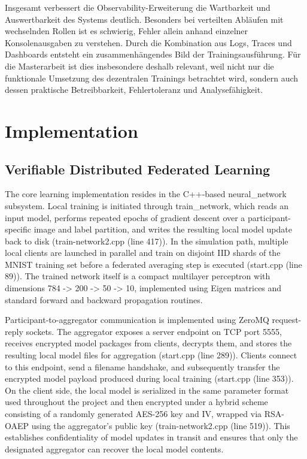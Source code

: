 Insgesamt verbessert die Observability-Erweiterung die Wartbarkeit und Auswertbarkeit des Systems deutlich. Besonders bei verteilten Abläufen mit wechselnden Rollen ist es schwierig, Fehler allein anhand einzelner Konsolenausgaben zu verstehen. Durch die Kombination aus Logs, Traces und Dashboards entsteht ein zusammenhängendes Bild der Trainingsausführung. Für die Masterarbeit ist dies insbesondere deshalb relevant, weil nicht nur die funktionale Umsetzung des dezentralen Trainings betrachtet wird, sondern auch dessen praktische Betreibbarkeit, Fehlertoleranz und Analysefähigkeit.


\chapter{Implementation}
\label{cha:chapter3}

\section{Verifiable Distributed Federated Learning}

The core learning implementation resides in the C++-based neural_network subsystem. Local training is initiated through train_network, which reads an input model, performs repeated epochs of gradient descent over a participant-specific image and label partition, and writes the resulting local model update back to disk (train-network2.cpp (line 417)). In the simulation path, multiple local clients are launched in parallel and train on disjoint IID shards of the MNIST training set before a federated averaging step is executed (start.cpp (line 89)). The trained network itself is a compact multilayer perceptron with dimensions 784 -> 200 -> 50 -> 10, implemented using Eigen matrices and standard forward and backward propagation routines.

Participant-to-aggregator communication is implemented using ZeroMQ request-reply sockets. The aggregator exposes a server endpoint on TCP port 5555, receives encrypted model packages from clients, decrypts them, and stores the resulting local model files for aggregation (start.cpp (line 289)). Clients connect to this endpoint, send a filename handshake, and subsequently transfer the encrypted model payload produced during local training (start.cpp (line 353)). On the client side, the local model is serialized in the same parameter format used throughout the project and then encrypted under a hybrid scheme consisting of a randomly generated AES-256 key and IV, wrapped via RSA-OAEP using the aggregator’s public key (train-network2.cpp (line 519)). This establishes confidentiality of model updates in transit and ensures that only the designated aggregator can recover the local model contents.

